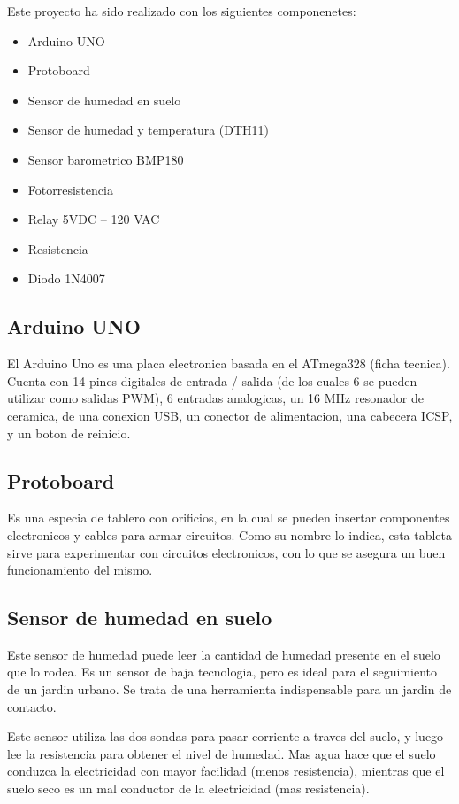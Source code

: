 \documentclass{article}
\begin{document}
Este proyecto ha sido realizado con los siguientes componenetes:

\begin{itemize}
	\item Arduino UNO
	\item Protoboard
	\item Sensor de humedad en suelo
	\item Sensor de humedad  y temperatura (DTH11)
	\item Sensor barometrico BMP180
	\item Fotorresistencia
	\item Relay 5VDC – 120 VAC
	\item Resistencia
	\item Diodo 1N4007
\end{itemize}

\subsection{Arduino UNO}

El Arduino Uno es una placa electronica basada en el  ATmega328  (ficha tecnica). Cuenta con 14 pines digitales de entrada / salida (de los cuales 6 se pueden utilizar como salidas PWM), 6 entradas analogicas, un 16  MHz  resonador de ceramica, de una conexion USB, un conector de alimentacion, una cabecera ICSP, y un boton de reinicio.

\subsection{Protoboard}

Es una especia de tablero con orificios, en la cual se pueden insertar componentes electronicos y cables para armar circuitos. Como su nombre lo indica, esta tableta sirve para experimentar con circuitos electronicos, con lo que se asegura un buen funcionamiento del mismo. 

\subsection{Sensor de humedad en suelo}

Este sensor de humedad puede leer la cantidad de humedad presente en el suelo que lo rodea. Es un sensor de baja tecnologia, pero es ideal para el seguimiento de un jardin urbano. Se trata de una herramienta indispensable para un jardin de contacto.

Este sensor utiliza las dos sondas para pasar corriente a traves del suelo, y luego  lee la resistencia para obtener el nivel de humedad. Mas agua hace que el suelo conduzca la electricidad con mayor facilidad (menos resistencia), mientras que el suelo seco es un mal conductor de la electricidad (mas resistencia).
\end{document}
